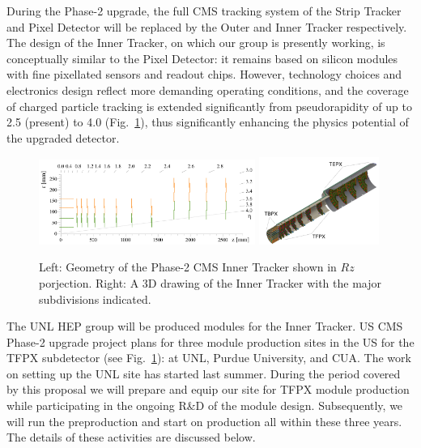 During the Phase-2 upgrade, the full CMS tracking system of the Strip Tracker and Pixel Detector will be replaced by the Outer and Inner Tracker respectively. The design of the Inner Tracker, on which our group is presently working, is conceptually similar to the Pixel Detector: it remains based on silicon modules with fine pixellated sensors and readout chips. However, technology choices and electronics design reflect more demanding operating conditions, and the coverage of charged particle tracking is extended significantly from pseudorapidity of up to 2.5 (present) to 4.0 (Fig.~\ref{fig:TFPX}), thus significantly enhancing the physics potential of the upgraded detector. 


\begin{figure}
\centering\includegraphics[width=0.63\textwidth]{figs/phase2_inner_tracker_geometry_lowres.png}
\centering\includegraphics[width=0.35\textwidth]{figs/phsae2_inner_tracker_3D.png}
\caption{\label{fig:TFPX} Left: Geometry of the Phase-2 CMS Inner Tracker shown in $Rz$ porjection. Right: A 3D drawing of the Inner Tracker with the major subdivisions indicated.}
\end{figure}

The UNL HEP group will be produced modules for the Inner Tracker. US CMS Phase-2 upgrade project plans for three module production sites in the US for the TFPX subdetector (see Fig.~\ref{fig:TFPX}): at UNL, Purdue University, and CUA. The work on setting up the UNL site has started last summer. During the period covered by this proposal we will prepare and equip our site for TFPX module production while participating in the ongoing R\&D of the module design. Subsequently, we will run the preproduction and start on production all within these three years. The details of these activities are discussed below.

